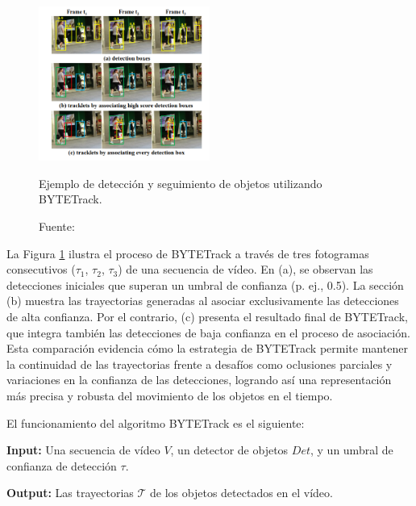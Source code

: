 \documentclass[11pt,spanish,listoffigures,listoftables]{tfgetsinf}
\begin{document}
\begin{figure}[H]

   \centering
   \includegraphics[width=0.5\textwidth]{images/estado_del_arte/BYTETrack_deteccion.png}
   \caption{Ejemplo de detección y seguimiento de objetos utilizando BYTETrack.}
   \label{fig:bytetrack_deteccion}
   \caption*{Fuente: \cite{zhang2022bytetrackmultiobjecttrackingassociating}}
\end{figure}

La Figura \ref{fig:bytetrack_deteccion} ilustra el proceso de BYTETrack a través de tres fotogramas consecutivos ($\tau_1$, $\tau_2$, $\tau_3$) de una secuencia de vídeo. En (a), se observan las detecciones iniciales que superan un umbral de confianza (p. ej., 0.5). La sección (b) muestra las trayectorias generadas al asociar exclusivamente las detecciones de alta confianza. Por el contrario, (c) presenta el resultado final de BYTETrack, que integra también las detecciones de baja confianza en el proceso de asociación. Esta comparación evidencia cómo la estrategia de BYTETrack permite mantener la continuidad de las trayectorias frente a desafíos como oclusiones parciales y variaciones en la confianza de las detecciones, logrando así una representación más precisa y robusta del movimiento de los objetos en el tiempo.


El funcionamiento del algoritmo BYTETrack es el siguiente:

\textbf{Input:} Una secuencia de vídeo $V$, un detector de objetos $Det$, y un umbral de confianza de detección $\tau$.

\textbf{Output:} Las trayectorias $\mathcal{T}$ de los objetos detectados en el vídeo.
\end{document}
